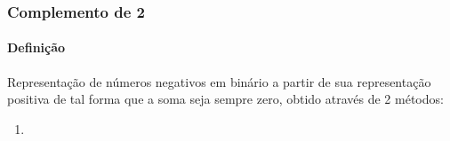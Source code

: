 \documentclass{article}
\begin{document}
        \subsubsection{Complemento de 2}
            \paragraph{Definição}Representação de números negativos em binário a partir de sua representação positiva de tal forma que a soma seja sempre zero, obtido através de 2 métodos:
                \begin{enumerate}
                    \item 
                \end{enumerate}
\end{document}

